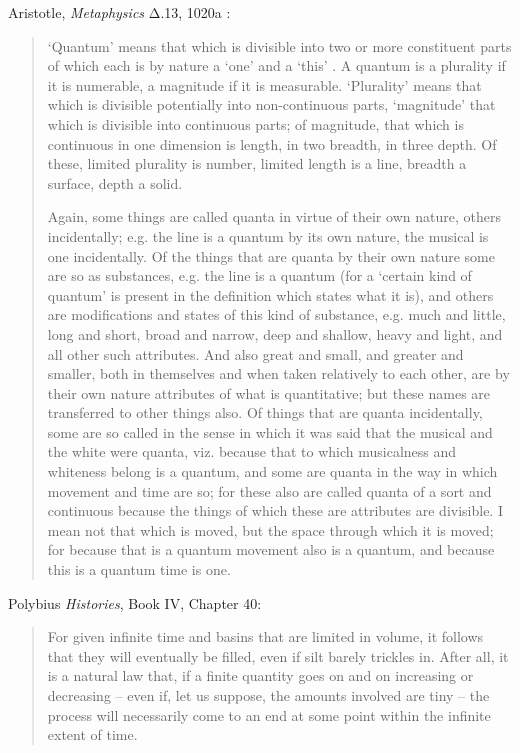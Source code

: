 \documentclass{article}
\begin{document}
Aristotle, {\em Metaphysics} Δ.13, 1020a \cite{metaphysica}:

\begin{quote}
`Quantum' means that which is divisible into two or more constituent parts of which each is by nature a `one'
and a `this' . A quantum is a plurality if it is numerable,
a magnitude if it is measurable. `Plurality' means that which is divisible potentially into non-continuous parts,
`magnitude' that which is divisible into continuous parts; of magnitude, that which is continuous in one dimension is length, in two breadth, in three depth. Of these, limited plurality is number, limited length is a line, breadth a surface, depth a solid.

Again, some things are called quanta in virtue of their
own nature, others incidentally; e.g. the line is a quantum by its own nature, the musical is one incidentally. Of the things that are quanta by their own nature some are so as 
substances, e.g. the line is a quantum (for a `certain kind of quantum' is present in the definition which states what it is), and others are modifications and states of this kind of substance, e.g. much and little, long and short, broad and 
narrow, deep and shallow, heavy and light, and all other such attributes. And also great and small, and greater and smaller, both in themselves and when taken relatively to each other, are by their own nature attributes of what is quantitative; but these names are transferred to other things also. Of things that are quanta incidentally, some are so called in
the sense in which it was said that the musical and the white were quanta, viz. because that to which musicalness and whiteness belong is a quantum, and some are quanta in the way in which movement and time are so; for these also are
called quanta of a sort and continuous because the things of which these are attributes are divisible. I mean not that which is moved, but the space through which it is moved; for because that is a quantum movement also is a quantum, and because this is a quantum time is one.
\end{quote}

Polybius {\em Histories}, Book IV, Chapter 40:

\begin{quote}
For given infinite time and basins that are limited in volume,
it follows that they will eventually be filled, even if silt barely trickles in. After all, it is a natural law that,
if a finite quantity goes on and on increasing or decreasing -- even if, let us suppose, the amounts involved
are tiny -- the process will necessarily come to an end at some point within the infinite extent of time.
\end{quote}
\end{document}
